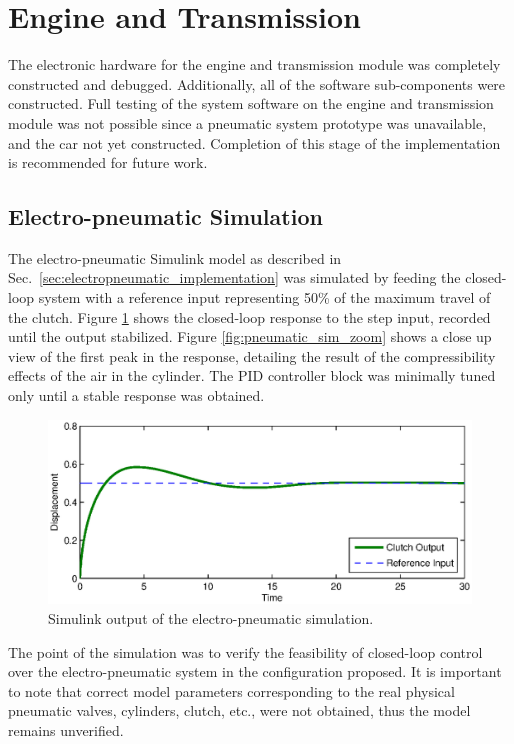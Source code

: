 \section{Engine and Transmission}

The electronic hardware for the engine and transmission module was completely constructed and debugged. Additionally, all of the software sub-components were constructed. Full testing of the system software on the engine and transmission module was not possible since a pneumatic system prototype was unavailable, and the car not yet constructed. Completion of this stage of the implementation is recommended for future work.

\subsection{Electro-pneumatic Simulation}

The electro-pneumatic Simulink model as described in Sec.\ \ref{sec:electropneumatic_implementation} was simulated by feeding the closed-loop system with a reference input representing 50\% of the maximum travel of the clutch. Figure \ref{fig:pneumatic_sim} shows the closed-loop response to the step input, recorded until the output stabilized. Figure \ref{fig:pneumatic_sim_zoom} shows a close up view of the first peak in the response, detailing the result of the compressibility effects of the air in the cylinder. The PID controller block was minimally tuned only until a stable response was obtained.

\begin{figure}[H]
 \centering
 \includegraphics[width=5in,keepaspectratio]{results/figures/electro-pneumatic_simulation_plot.eps}
 \caption{Simulink output of the electro-pneumatic simulation.}
 \label{fig:pneumatic_sim}
\end{figure}

The point of the simulation was to verify the feasibility of closed-loop control over the electro-pneumatic system in the configuration proposed. It is important to note that correct model parameters corresponding to the real physical pneumatic valves, cylinders, clutch, etc., were not obtained, thus the model remains unverified.

